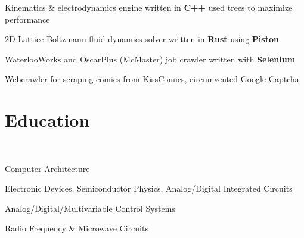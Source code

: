 \documentclass[]{chandan-cv}
\begin{document}
\begin{minipage}[t]{0.77\textwidth}

\descript{ }
\location{ }
\begin{tightemize}
	\item Kinematics \& electrodynamics engine written in \textbf{C++} used trees to maximize performance
	\item 2D Lattice-Boltzmann fluid dynamics solver written in \textbf{Rust} using \textbf{Piston}
	\item WaterlooWorks and OscarPlus (McMaster) job crawler written with \textbf{Selenium}
	\item Webcrawler for scraping comics from KissComics, circumvented Google Captcha
\end{tightemize}
\sectionsep

\section{Education}

 \\


\descript{ }
\location{ }
\begin{tightemize}
        \item Computer Architecture
		\item Electronic Devices, Semiconductor Physics, Analog/Digital Integrated Circuits
		\item Analog/Digital/Multivariable Control Systems
		\item Radio Frequency \& Microwave Circuits
\end{tightemize}
\sectionsep


\end{minipage}
\end{document}
